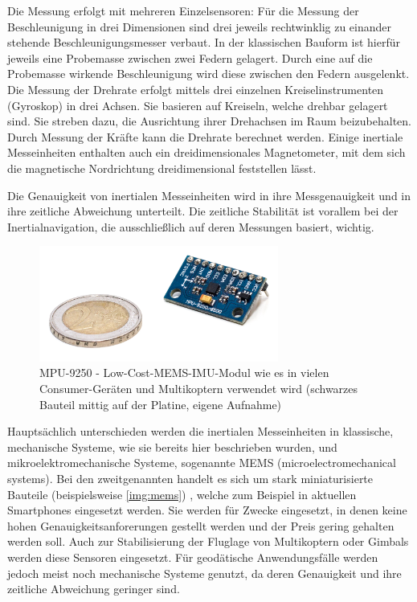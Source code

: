 \documentclass[a4paper,12pt,bibliography=totoc, listof=totoc,titlepage,pointlessnumbers]{scrreprt}
\begin{document}
Die Messung erfolgt mit mehreren Einzelsensoren: Für die Messung der Beschleunigung in drei Dimensionen sind drei jeweils rechtwinklig zu einander stehende Beschleunigungsmesser verbaut. In der klassischen Bauform ist hierfür jeweils eine Probemasse zwischen zwei Federn gelagert. Durch eine auf die Probemasse wirkende Beschleunigung wird diese zwischen den Federn ausgelenkt. Die Messung der Drehrate erfolgt mittels drei einzelnen Kreiselinstrumenten (Gyroskop) in drei Achsen. Sie basieren auf Kreiseln, welche drehbar gelagert sind. Sie streben dazu, die Ausrichtung ihrer Drehachsen im Raum beizubehalten. Durch Messung der Kräfte kann die Drehrate berechnet werden. Einige inertiale Messeinheiten enthalten auch ein dreidimensionales Magnetometer, mit dem sich die magnetische Nordrichtung dreidimensional feststellen lässt.

Die Genauigkeit von inertialen Messeinheiten wird in ihre Messgenauigkeit und in ihre zeitliche Abweichung unterteilt. Die zeitliche Stabilität ist vorallem bei der Inertialnavigation, die ausschließlich auf deren Messungen basiert, wichtig.

\begin{figure}[ht!]
 \centering
 \includegraphics[width=0.7\textwidth]{./img/mems.jpg}
 \caption{MPU-9250 - Low-Cost-MEMS-IMU-Modul wie es in vielen Consumer-Geräten und Multikoptern verwendet wird (schwarzes Bauteil mittig auf der Platine, eigene Aufnahme)}
 \label{img:mems}
\end{figure}

Hauptsächlich unterschieden werden die inertialen Messeinheiten in klassische, mechanische Systeme, wie sie bereits hier beschrieben wurden, und mikroelektromechanische Systeme, sogenannte MEMS (microelectromechanical systems). Bei den zweitgenannten handelt es sich um stark miniaturisierte Bauteile (beispielsweise \autoref{img:mems}) , welche zum Beispiel in aktuellen Smartphones eingesetzt werden. Sie werden für Zwecke eingesetzt, in denen keine hohen Genauigkeitsanforerungen gestellt werden und der Preis gering gehalten werden soll. Auch zur Stabilisierung der Fluglage von Multikoptern oder Gimbals werden diese Sensoren eingesetzt. Für geodätische Anwendungsfälle werden jedoch meist noch mechanische Systeme genutzt, da deren Genauigkeit und ihre zeitliche Abweichung geringer sind.
\end{document}
